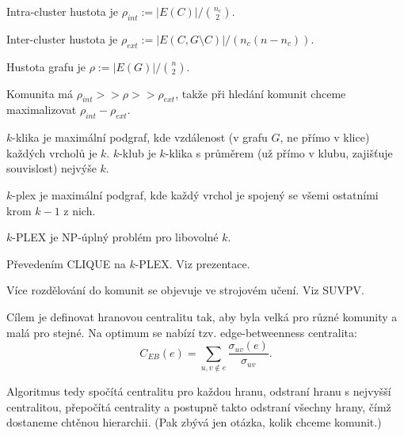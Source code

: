 \documentclass[12pt]{article}					%
\begin{document}
    \begin{definice}
        Intra-cluster hustota je $\rho_{int} := |E(C)|/\binom{n_c}{2}$.
        
        Inter-cluster hustota je $\rho_{ext} := |E(C, G \setminus C)|/(n_c(n-n_c))$.

        Hustota grafu je $\rho := |E(G)|/\binom{n}{2}$.
    \end{definice}

    \begin{dusledek}
        Komunita má $\rho_{int} >> \rho >> \rho_{ext}$, takže při hledání komunit chceme maximalizovat $\rho_{int} - \rho_{ext}$.
    \end{dusledek}

    \begin{definice}
        $k$-klika je maximální podgraf, kde vzdálenost (v grafu $G$, ne přímo v klice) každých vrcholů je $k$. $k$-klub je $k$-klika s průměrem (už přímo v klubu, zajišťuje souvislost) nejvýše $k$.

        $k$-plex je maximální podgraf, kde každý vrchol je spojený se všemi ostatními krom $k-1$ z nich.
    \end{definice}

    \begin{veta}
        $k$-PLEX je NP-úplný problém pro libovolné $k$.

        \begin{dukazin}
            Převedením CLIQUE na $k$-PLEX. Viz prezentace.
        \end{dukazin}
    \end{veta}

    \begin{poznamka}
        Více rozdělování do komunit se objevuje ve strojovém učení. Viz SUVPV.
    \end{poznamka}

    \begin{definice}
        Cílem je definovat hranovou centralitu tak, aby byla velká pro různé komunity a malá pro stejné. Na optimum se nabízí tzv. edge-betweenness centralita:
        $$ C_{EB}(e) = \sum_{u, v \notin e} \frac{\sigma_{uv}(e)}{\sigma_{uv}}. $$ 

        Algoritmus tedy spočítá centralitu pro každou hranu, odstraní hranu s nejvyšší centralitou, přepočítá centrality a postupně takto odstraní všechny hrany, čímž dostaneme chtěnou hierarchii. (Pak zbývá jen otázka, kolik chceme komunit.)
    \end{definice}
\end{document}
